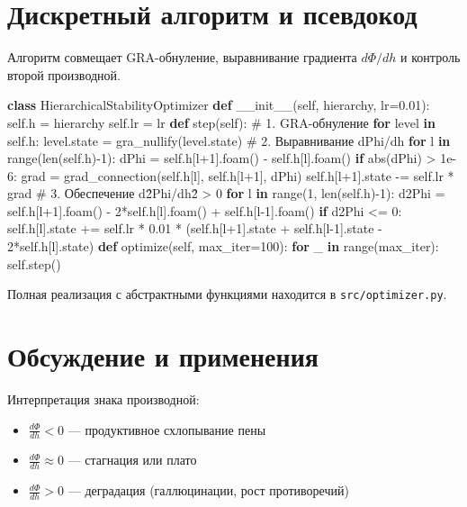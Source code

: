 \documentclass[11pt,a4paper]{article}
\begin{document}
\section{Дискретный алгоритм и псевдокод}

Алгоритм совмещает GRA-обнуление, выравнивание градиента $d\Phi/dh$ и контроль второй производной.

\begin{algorithm}[H]
\caption{HierarchicalStabilityOptimizer}
\begin{algorithmic}[1]
\State \textbf{class} HierarchicalStabilityOptimizer
\State \quad \textbf{def} \_\_init\_\_(self, hierarchy, lr=0.01):
\State \quad \quad self.h = hierarchy 
\State \quad \quad self.lr = lr
\State \quad \textbf{def} step(self):
\State \quad \quad \# 1. GRA-обнуление
\State \quad \quad \textbf{for} level \textbf{in} self.h: level.state = gra\_nullify(level.state)
\State \quad \quad \# 2. Выравнивание dPhi/dh
\State \quad \quad \textbf{for} l \textbf{in} range(len(self.h)-1):
\State \quad \quad \quad dPhi = self.h[l+1].foam() - self.h[l].foam()
\State \quad \quad \quad \textbf{if} abs(dPhi) > 1e-6:
\State \quad \quad \quad \quad grad = grad\_connection(self.h[l], self.h[l+1], dPhi)
\State \quad \quad \quad \quad self.h[l+1].state -= self.lr * grad
\State \quad \quad \# 3. Обеспечение d\^2Phi/dh\^2 > 0
\State \quad \quad \textbf{for} l \textbf{in} range(1, len(self.h)-1):
\State \quad \quad \quad d2Phi = self.h[l+1].foam() - 2*self.h[l].foam() + self.h[l-1].foam()
\State \quad \quad \quad \textbf{if} d2Phi <= 0:
\State \quad \quad \quad \quad self.h[l].state += self.lr * 0.01 * (self.h[l+1].state + self.h[l-1].state - 2*self.h[l].state)
\State \quad \textbf{def} optimize(self, max\_iter=100):
\State \quad \quad \textbf{for} \_ \textbf{in} range(max\_iter): self.step()
\end{algorithmic}
\end{algorithm}

Полная реализация с абстрактными функциями находится в \texttt{src/optimizer.py}.

\section{Обсуждение и применения}

Интерпретация знака производной:
\begin{itemize}
    \item $\frac{d\Phi}{dh} < 0$ --- продуктивное схлопывание пены
    \item $\frac{d\Phi}{dh} \approx 0$ --- стагнация или плато
    \item $\frac{d\Phi}{dh} > 0$ --- деградация (галлюцинации, рост противоречий)
\end{itemize}
\end{document}
